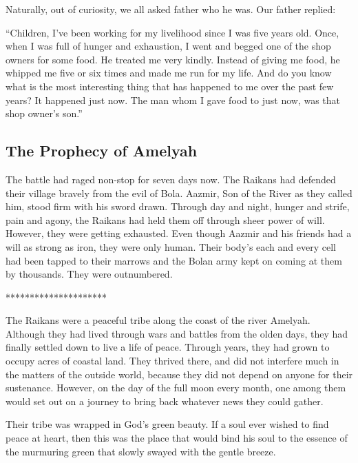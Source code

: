 \documentclass[twoside,11pt,titlepage]{article}
\begin{document}
Naturally, out of curiosity, we all asked father who he was. Our father replied:

``Children, I've been working for my livelihood since I was five years old. Once, when I was full of hunger and exhaustion, I went and begged one of the shop owners for some food. He treated me very kindly. Instead of giving me food, he whipped me five or six times and made me run for my life. And do you know what is the most interesting thing that has happened to me over the past few years? It happened just now. The man whom I gave food to just now, was that shop owner's son.''

\newpage
\begin{center}
  \section{The Prophecy of Amelyah}
\end{center}
\bigskip
\bigskip
\bigskip
The battle had raged non-stop for seven days now. The Raikans had defended their village bravely from the evil of Bola. Aazmir, Son of the River as they called him, stood firm with his sword drawn. Through day and night, hunger and strife, pain and agony, the Raikans had held them off through sheer power of will. However, they were getting exhausted. Even though Aazmir and his friends had a will as strong as iron, they were only human. Their body's each and every cell had been tapped to their marrows and the Bolan army kept on coming at them by thousands. They were outnumbered.

\bigskip
\begin{center}
*********************
\end{center}

The Raikans were a peaceful tribe along the coast of the river Amelyah. Although they had lived through wars and battles from the olden days, they had finally settled down to live a life of peace. Through years, they had grown to occupy acres of coastal land. They thrived there, and did not interfere much in the matters of the outside world, because they did not depend on anyone for their sustenance. However, on the day of the full moon every month, one among them would set out on a journey to bring back whatever news they could gather.

Their tribe was wrapped in God's green beauty. If a soul ever wished to find peace at heart, then this was the place that would bind his soul to the essence of the murmuring green that slowly swayed with the gentle breeze.
\end{document}
